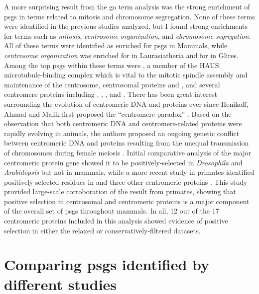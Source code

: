 A more surprising result from the \ac{go} term analysis was the strong
enrichment of \acp{psg} in terms related to mitosis and chromosome
segregation. None of these terms were identified in the previous
studies analyzed, but I found strong enrichments for terms such as
\emph{mitosis}, \emph{centrosome organization}, and \emph{chromosome
  segregation}. All of these terms were identified as enriched for
\psgeone \acp{psg} in Mammals, while \emph{centrosome organization}
was enriched for \psgeone in Laurasiatheria and for \psgefive in
Glires. Among the top \acp{psg} within these terms were ,
a member of the HAUS microtubule-binding complex which is vital to the
mitotic spindle assembly and maintenance of the centrosome,
centrosomal proteins  and , and several
centromere proteins including , ,
, and . There has been great interest
surrounding the evolution of centromeric DNA and proteins ever since
Henikoff, Ahmad and Malik first proposed the ``centromere paradox''
\citeyearpar{Henikoff2001}. Based on the observation that both
centromeric DNA and centromere-related proteins were rapidly evolving
in animals, the authors proposed an ongoing genetic conflict between
centromeric DNA and proteins resulting from the unequal transmission
of chromosomes during female meiosis
\citep{Henikoff2001,Malik2002,Malik2009}. Initial comparative analysis
of the major centromeric protein  gene showed it to be
positively-selected in \emph{Drosophila} and \emph{Arabidopsis} but
not in mammals, while a more recent study in primates identified
positively-selected residues in  and three other
centromeric proteins \citep{Schueler2010}. This study provided
large-scale corroboration of the result from primates, showing that
positive selection in centrosomal and centromeric proteins is a major
component of the overall set of \acp{psg} throughout mammals. In all,
12 out of the 17 centromeric proteins included in this analysis showed
evidence of positive selection in either the relaxed or
conservatively-filtered datasets.

\section{Comparing \acp{psg} identified by different studies}

